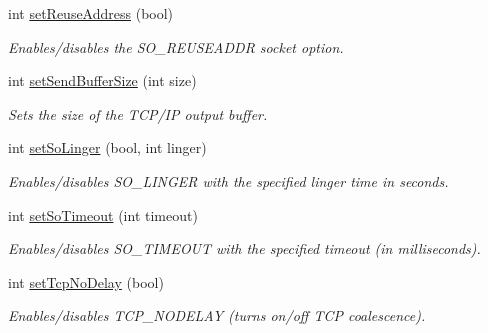 \begin{DoxyCompactItemize}
\mbox{\label{classcppu_1_1_socket_a27b7fe34e172ad1f97c304d2786f624a}} 
int \mbox{\hyperlink{classcppu_1_1_socket_a27b7fe34e172ad1f97c304d2786f624a}{set\+Reuse\+Address}} (bool)
\begin{DoxyCompactList}\small\item\em Enables/disables the S\+O\+\_\+\+R\+E\+U\+S\+E\+A\+D\+DR socket option. \end{DoxyCompactList}\item 
\mbox{\label{classcppu_1_1_socket_aefda954454d860fa6a6d41b3d5cd26db}} 
int \mbox{\hyperlink{classcppu_1_1_socket_aefda954454d860fa6a6d41b3d5cd26db}{set\+Send\+Buffer\+Size}} (int size)
\begin{DoxyCompactList}\small\item\em Sets the size of the T\+C\+P/\+IP output buffer. \end{DoxyCompactList}\item 
\mbox{\label{classcppu_1_1_socket_ae87eb0335c072f765bf2b6a47162e7f5}} 
int \mbox{\hyperlink{classcppu_1_1_socket_ae87eb0335c072f765bf2b6a47162e7f5}{set\+So\+Linger}} (bool, int linger)
\begin{DoxyCompactList}\small\item\em Enables/disables S\+O\+\_\+\+L\+I\+N\+G\+ER with the specified linger time in seconds. \end{DoxyCompactList}\item 
\mbox{\label{classcppu_1_1_socket_ae5dea30a1cae2dbdbdaf11a9f7ffa444}} 
int \mbox{\hyperlink{classcppu_1_1_socket_ae5dea30a1cae2dbdbdaf11a9f7ffa444}{set\+So\+Timeout}} (int timeout)
\begin{DoxyCompactList}\small\item\em Enables/disables S\+O\+\_\+\+T\+I\+M\+E\+O\+UT with the specified timeout (in milliseconds). \end{DoxyCompactList}\item 
\mbox{\label{classcppu_1_1_socket_a6b29a9e12926b07f65b8dc52176131c5}} 
int \mbox{\hyperlink{classcppu_1_1_socket_a6b29a9e12926b07f65b8dc52176131c5}{set\+Tcp\+No\+Delay}} (bool)
\begin{DoxyCompactList}\small\item\em Enables/disables T\+C\+P\+\_\+\+N\+O\+D\+E\+L\+AY (turns on/off T\+CP coalescence). \end{DoxyCompactList}\item 

\end{DoxyCompactItemize}

